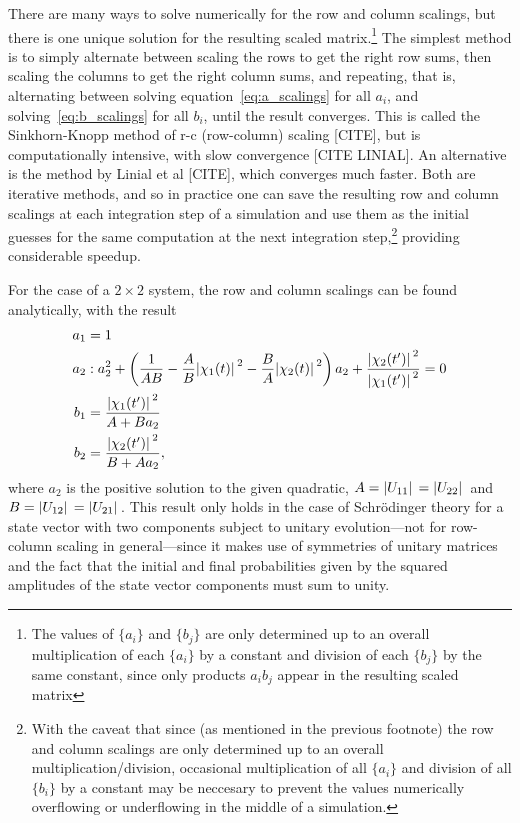 There are many ways to solve numerically for the row and column scalings, but there is one unique solution for the resulting scaled matrix.\footnote{The values of $\{a_i\}$ and $\{b_j\}$ are only determined up to an overall multiplication of each $\{a_i\}$ by a constant and division of each $\{b_j\}$ by the same constant, since only products $a_i b_j$ appear in the resulting scaled matrix} The simplest method is to simply alternate between scaling the rows to get the right row sums, then scaling the columns to get the right column sums, and repeating, that is, alternating between solving equation~\eqref{eq:a_scalings} for all $a_i$, and solving~\eqref{eq:b_scalings} for all $b_i$, until the result converges. This is called the Sinkhorn-Knopp method of r-c (row-column) scaling [CITE], but is computationally intensive, with slow convergence [CITE LINIAL]. An alternative is the method by Linial et al [CITE], which converges much faster. Both are iterative methods, and so in practice one can save the resulting row and column scalings at each integration step of a simulation and use them as the initial guesses for the same computation at the next integration step,\footnote{With the caveat that since (as mentioned in the previous footnote) the row and column scalings are only determined up to an overall multiplication/division, occasional multiplication of all $\{a_i\}$ and division of all $\{b_i\}$ by a constant may be neccesary to prevent the values numerically overflowing or underflowing in the middle of a simulation.} providing considerable speedup.

For the case of a $2\times2$ system, the row and column scalings can be found analytically, with the result
\begin{align}
a_1 &= 1\\
a_2 &: a_2^2 + 
\left(\frac1{AB} - \frac AB \abs{\chi_1(t)}^2 - \frac BA \abs{\chi_2(t)}^2\right)a_2
+ \frac{\abs{\chi_2(t^\prime)}^2}{\abs{\chi_1(t^\prime)}^2} = 0\\
b_1 &= \frac{\abs{\chi_1(t^\prime)}^2}{A + B a_2}\\
b_2 &= \frac{\abs{\chi_2(t^\prime)}^2}{B + A a_2},
\end{align}
where $a_2$ is the positive solution to the given quadratic, $A = \abs{U_{11}} = \abs{U_{22}}$ and $B = \abs{U_{12}} = \abs{U_{21}}$. This result only holds in the case of Schr\"odinger theory for a state vector with two components subject to unitary evolution---not for row-column scaling in general---since it makes use of symmetries of unitary matrices and the fact that the initial and final probabilities given by the squared amplitudes of the state vector components must sum to unity.

